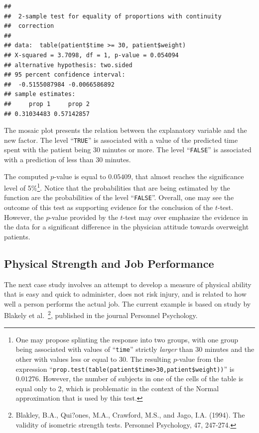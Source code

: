 \documentclass[]{krantz}
\theoremstyle{definition}
\theoremstyle{definition}
\theoremstyle{definition}
\theoremstyle{remark}
\begin{document}
\begin{verbatim}
## 
##  2-sample test for equality of proportions with continuity
##  correction
## 
## data:  table(patient$time >= 30, patient$weight)
## X-squared = 3.7098, df = 1, p-value = 0.054094
## alternative hypothesis: two.sided
## 95 percent confidence interval:
##  -0.5155087984 -0.0066586892
## sample estimates:
##     prop 1     prop 2 
## 0.31034483 0.57142857
\end{verbatim}

The mosaic plot presents the relation between the explanatory variable
and the new factor. The level ``\texttt{TRUE}'' is associated with a
value of the predicted time spent with the patient being 30 minutes or
more. The level ``\texttt{FALSE}'' is associated with a prediction of
less than 30 minutes.

The computed \(p\)-value is equal to \(0.05409\), that almost reaches
the significance level of 5\%\footnote{One may propose splinting the
  response into two groups, with one group being associated with values
  of ``\texttt{time}'' strictly \emph{larger} than 30 minutes and the
  other with values less or equal to 30. The resulting \(p\)-value from
  the expression
  ``\texttt{prop.test(table(patient\$time\textgreater{}30,patient\$weight))}''
  is \(0.01276\). However, the number of subjects in one of the cells of
  the table is equal only to 2, which is problematic in the context of
  the Normal approximation that is used by this test.}. Notice that the
probabilities that are being estimated by the function are the
probabilities of the level ``\texttt{FALSE}''. Overall, one may see the
outcome of this test as supporting evidence for the conclusion of the
\(t\)-test. However, the \(p\)-value provided by the \(t\)-test may over
emphasize the evidence in the data for a significant difference in the
physician attitude towards overweight patients.

\subsection{Physical Strength and Job
Performance}\label{physical-strength-and-job-performance}

The next case study involves an attempt to develop a measure of physical
ability that is easy and quick to administer, does not risk injury, and
is related to how well a person performs the actual job. The current
example is based on study by Blakely et al.~\footnote{Blakley, B.A.,
  Qui?ones, M.A., Crawford, M.S., and Jago, I.A. (1994). The validity of
  isometric strength tests. Personnel Psychology, 47, 247-274.},
published in the journal Personnel Psychology.
\end{document}
